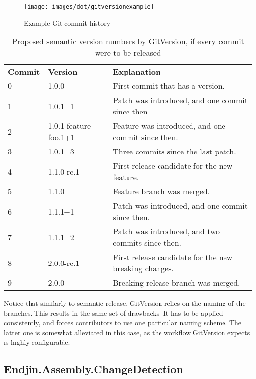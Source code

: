 \documentclass{l4proj}
\begin{document}
\begin{figure}[H]
\centering
\texttt{[image: images/dot/gitversionexample]}
\caption{Example Git commit history}
\end{figure}

\begin{table}[H]
\centering
\begin{tabular}{|l|l|l|}
\textbf{Commit} & \textbf{Version} & \textbf{Explanation}                              \\
0      & 1.0.0                 & First commit that has a version.                      \\
1      & 1.0.1+1               & Patch was introduced, and one commit since then.      \\
2      & 1.0.1-feature-foo.1+1 & Feature was introduced, and one commit since then.    \\
3      & 1.0.1+3               & Three commits since the last patch.                   \\
4      & 1.1.0-rc.1            & First release candidate for the new feature.          \\
5      & 1.1.0                 & Feature branch was merged.                            \\
6      & 1.1.1+1               & Patch was introduced, and one commit since then.      \\
7      & 1.1.1+2               & Patch was introduced, and two commits since then.     \\
8      & 2.0.0-rc.1            & First release candidate for the new breaking changes. \\
9      & 2.0.0                 & Breaking release branch was merged.
\end{tabular}
\caption{Proposed semantic version numbers by GitVersion, if every
commit were to be released}
\end{table}

Notice that similarly to semantic-release, GitVersion relies on the
naming of the branches. This results in the same set of drawbacks. It
has to be applied consistently, and forces contributors to use one
particular naming scheme. The latter one is somewhat alleviated in
this case, as the workflow GitVersion expects is highly
configurable\cite{GitVersionConfiguration}.

\subsection{Endjin.Assembly.ChangeDetection}
\end{document}
